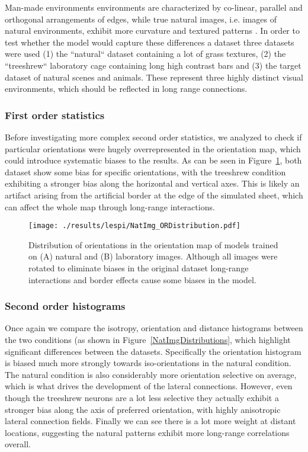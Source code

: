 Man-made environments environments are characterized by co-linear,
parallel and orthogonal arrangements of edges, while true natural
images, i.e. images of natural environments, exhibit more curvature
and textured patterns \citep{Perrinet2015}. In order to test whether
the model would capture these differences a dataset three datasets
were used (1) the ``natural`` dataset containing a lot of grass
textures, (2) the ``treeshrew`` laboratory cage containing long high
contrast bars and (3) the \citep{Serre2007} target dataset of natural
scenes and animals. These represent three highly distinct visual
environments, which should be reflected in long range connections.

\subsubsection{First order statistics}

Before investigating more complex second order statistics, we analyzed
to check if particular orientations were hugely overrepresented in the
orientation map, which could introduce systematic biases to the
results. As can be seen in Figure~\ref{NatImgORs}, both dataset show
some bias for specific orientations, with the treeshrew condition
exhibiting a stronger bias along the horizontal and vertical
axes. This is likely an artifact arising from the artificial border at
the edge of the simulated sheet, which can affect the whole map
through long-range interactions.

\begin{figure}
	\centering
    \texttt{[image: ./results/lespi/NatImg\_ORDistribution.pdf]}
	\caption[Distribution of orientations in the orientation map of
      models trained on natural and laboratory images.]{Distribution
      of orientations in the orientation map of models trained on (A)
      natural and (B) laboratory images. Although all images were
      rotated to eliminate biases in the original dataset long-range
      interactions and border effects cause some biases in the model.}
	\label{NatImgORs}
\end{figure}

\subsubsection{Second order histograms}

Once again we compare the isotropy, orientation and distance
histograms between the two conditions (as shown in
Figure~\ref{NatImgDistributions}, which highlight significant
differences between the datasets. Specifically the orientation
histogram is biased much more strongly towards iso-orientations in the
natural condition. The natural condition is also considerably more
orientation selective on average, which is what drives the development
of the lateral connections. However, even though the treeshrew neurons
are a lot less selective they actually exhibit a stronger bias along
the axis of preferred orientation, with highly anisotropic lateral
connection fields. Finally we can see there is a lot more weight at
distant locations, suggesting the natural patterns exhibit more
long-range correlations overall.

